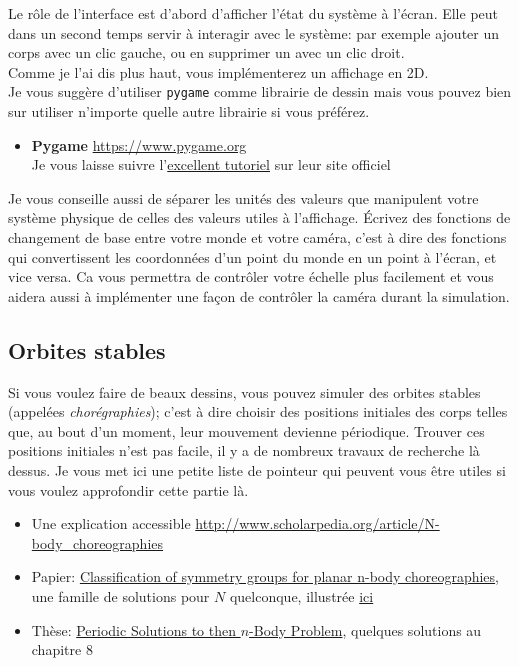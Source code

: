 \documentclass{article}
\begin{document}
Le rôle de l'interface est d'abord d'afficher l'état du système à l'écran. Elle peut dans un second temps servir à interagir avec le système: par exemple ajouter un corps avec un clic gauche, ou en supprimer un avec un clic droit.\\
Comme je l'ai dis plus haut, vous implémenterez un affichage en 2D.\\
Je vous suggère d'utiliser \verb!pygame! comme librairie de dessin mais vous pouvez bien sur utiliser n'importe quelle autre librairie si vous préférez.

\begin{itemize}
    \item \textbf{Pygame} \url{https://www.pygame.org}\\
    Je vous laisse suivre l'\href{https://www.pygame.org/docs/}{excellent tutoriel} sur leur site officiel
\end{itemize}

Je vous conseille aussi de séparer les unités des valeurs que manipulent votre système physique de celles des valeurs utiles à l'affichage. Écrivez des fonctions de changement de base entre votre monde et votre caméra, c'est à dire des fonctions qui convertissent les coordonnées d'un point du monde en un point à l'écran, et vice versa. Ca vous permettra de contrôler votre échelle plus facilement et vous aidera aussi à implémenter une façon de contrôler la caméra durant la simulation.

\subsection{Orbites stables}
\label{solstables}

Si vous voulez faire de beaux dessins, vous pouvez simuler des orbites stables (appelées \emph{chorégraphies}); c'est à dire choisir des positions initiales des corps telles que, au bout d'un moment, leur mouvement devienne périodique. Trouver ces positions initiales n'est pas facile, il y a de nombreux travaux de recherche là dessus. Je vous met ici une petite liste de pointeur qui peuvent vous être utiles si vous voulez approfondir cette partie là.

\begin{itemize}
    \item Une explication accessible \url{http://www.scholarpedia.org/article/N-body_choreographies}
    \item Papier: \href{http://eprints.maths.manchester.ac.uk/2063/1/choreographies.pdf}{Classification of symmetry groups for planar n-body choreographies}, une famille de solutions pour $N$ quelconque, illustrée \href{http://rectangleworld.com/demos/nBody/}{ici}
    \item Thèse: \href{http://www.combinatorialmath.ca/Students/DyckThesis.pdf}{Periodic Solutions to then $n$-Body Problem}, quelques solutions au chapitre 8
\end{itemize}
\end{document}
